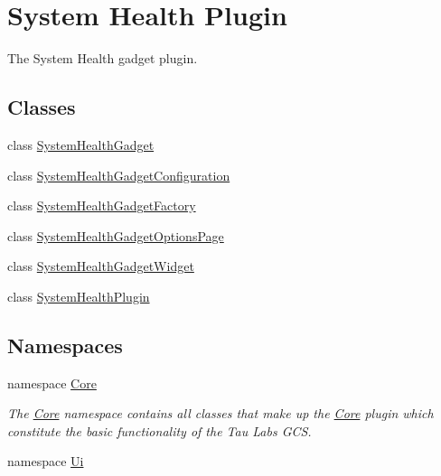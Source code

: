 \hypertarget{group___system_health_plugin}{\section{\-System \-Health \-Plugin}
\label{group___system_health_plugin}
}


\-The \-System \-Health gadget plugin.  


\subsection*{\-Classes}
\begin{DoxyCompactItemize}
\item 
class \hyperlink{class_system_health_gadget}{\-System\-Health\-Gadget}
\item 
class \hyperlink{class_system_health_gadget_configuration}{\-System\-Health\-Gadget\-Configuration}
\item 
class \hyperlink{class_system_health_gadget_factory}{\-System\-Health\-Gadget\-Factory}
\item 
class \hyperlink{class_system_health_gadget_options_page}{\-System\-Health\-Gadget\-Options\-Page}
\item 
class \hyperlink{class_system_health_gadget_widget}{\-System\-Health\-Gadget\-Widget}
\item 
class \hyperlink{class_system_health_plugin}{\-System\-Health\-Plugin}
\end{DoxyCompactItemize}
\subsection*{\-Namespaces}
\begin{DoxyCompactItemize}
\item 
namespace \hyperlink{namespace_core}{\-Core}
\begin{DoxyCompactList}\small\item\em \-The \hyperlink{namespace_core}{\-Core} namespace contains all classes that make up the \hyperlink{namespace_core}{\-Core} plugin which constitute the basic functionality of the \-Tau \-Labs \-G\-C\-S. \end{DoxyCompactList}\item 
namespace \hyperlink{namespace_ui}{\-Ui}
\end{DoxyCompactItemize}
